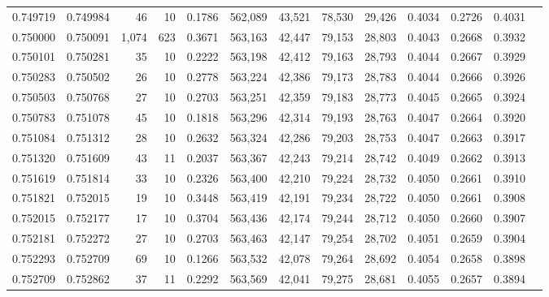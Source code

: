 \begin{tabular}{rrrrrrrrrrrrr}
0.749719 & 0.749984 &    46 &  10 &                                     0.1786 & 562,089 &  43,521 &  78,530 &  29,426 & 0.4034 & 0.2726 & 0.4031 \\
0.750000 & 0.750091 & 1,074 & 623 &                                     0.3671 & 563,163 &  42,447 &  79,153 &  28,803 & 0.4043 & 0.2668 & 0.3932 \\
0.750101 & 0.750281 &    35 &  10 &                                     0.2222 & 563,198 &  42,412 &  79,163 &  28,793 & 0.4044 & 0.2667 & 0.3929 \\
0.750283 & 0.750502 &    26 &  10 &                                     0.2778 & 563,224 &  42,386 &  79,173 &  28,783 & 0.4044 & 0.2666 & 0.3926 \\
0.750503 & 0.750768 &    27 &  10 &                                     0.2703 & 563,251 &  42,359 &  79,183 &  28,773 & 0.4045 & 0.2665 & 0.3924 \\
0.750783 & 0.751078 &    45 &  10 &                                     0.1818 & 563,296 &  42,314 &  79,193 &  28,763 & 0.4047 & 0.2664 & 0.3920 \\
0.751084 & 0.751312 &    28 &  10 &                                     0.2632 & 563,324 &  42,286 &  79,203 &  28,753 & 0.4047 & 0.2663 & 0.3917 \\
0.751320 & 0.751609 &    43 &  11 &                                     0.2037 & 563,367 &  42,243 &  79,214 &  28,742 & 0.4049 & 0.2662 & 0.3913 \\
0.751619 & 0.751814 &    33 &  10 &                                     0.2326 & 563,400 &  42,210 &  79,224 &  28,732 & 0.4050 & 0.2661 & 0.3910 \\
0.751821 & 0.752015 &    19 &  10 &                                     0.3448 & 563,419 &  42,191 &  79,234 &  28,722 & 0.4050 & 0.2661 & 0.3908 \\
0.752015 & 0.752177 &    17 &  10 &                                     0.3704 & 563,436 &  42,174 &  79,244 &  28,712 & 0.4050 & 0.2660 & 0.3907 \\
0.752181 & 0.752272 &    27 &  10 &                                     0.2703 & 563,463 &  42,147 &  79,254 &  28,702 & 0.4051 & 0.2659 & 0.3904 \\
0.752293 & 0.752709 &    69 &  10 &                                     0.1266 & 563,532 &  42,078 &  79,264 &  28,692 & 0.4054 & 0.2658 & 0.3898 \\
0.752709 & 0.752862 &    37 &  11 &                                     0.2292 & 563,569 &  42,041 &  79,275 &  28,681 & 0.4055 & 0.2657 & 0.3894 \\

\end{tabular}

